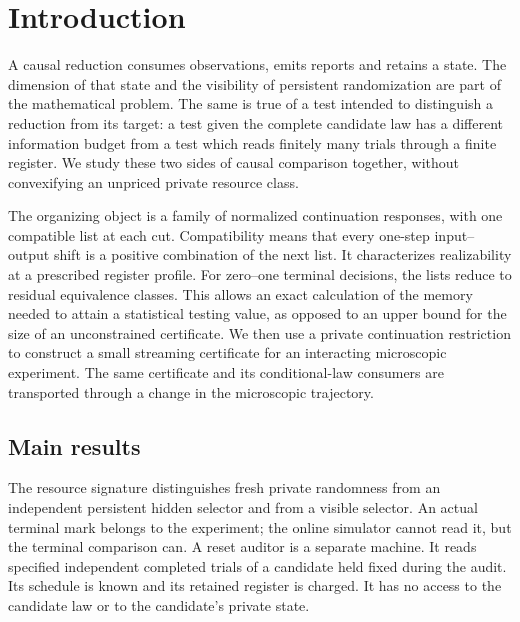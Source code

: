 \section{Introduction}
A causal reduction consumes observations, emits reports and retains a state.
The dimension of that state and the visibility of persistent randomization
are part of the mathematical problem. The same is true of a test intended
to distinguish a reduction from its target: a test given the complete
candidate law has a different information budget from a test which reads
finitely many trials through a finite register. We study these two sides
of causal comparison together, without convexifying an unpriced private
resource class.

The organizing object is a family of normalized continuation responses,
with one compatible list at each cut. Compatibility means that every
one-step input--output shift is a positive combination of the next list.
It characterizes realizability at a prescribed register profile. For
zero--one terminal decisions, the lists reduce to residual equivalence
classes. This allows an exact calculation of the memory needed to attain
a statistical testing value, as opposed to an upper bound for the size of
an unconstrained certificate. We then use a private continuation restriction
to construct a small streaming certificate for an interacting microscopic
experiment. The same certificate and its conditional-law consumers are
transported through a change in the microscopic trajectory.

\subsection{Main results}
The resource signature distinguishes fresh private randomness from an
independent persistent hidden selector and from a visible selector. An
actual terminal mark belongs to the experiment; the online simulator
cannot read it, but the terminal comparison can. A reset auditor is a
separate machine. It reads specified independent completed trials of a
candidate held fixed during the audit. Its schedule is known and its
retained register is charged. It has no access to the candidate law or to
the candidate's private state.

